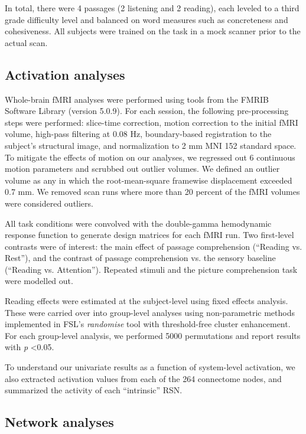 In total, there were 4 passages (2 listening and 2 reading), each leveled to a third grade difficulty level and balanced on word measures such as concreteness and cohesiveness.  All subjects were trained on the task in a mock scanner prior to the actual scan. 


\subsection{Activation analyses}

Whole-brain fMRI analyses were performed using tools from the FMRIB Software Library (version 5.0.9). For each session, the following pre-processing steps were performed:  slice-time correction, motion correction to the initial fMRI volume, high-pass filtering at 0.08 Hz, boundary-based registration to the subject's structural image, and normalization to 2 mm MNI 152 standard space. To mitigate the effects of motion on our analyses, we regressed out 6 continuous motion parameters and scrubbed out outlier volumes. We defined an outlier volume as any in which the root-mean-square framewise displacement exceeded 0.7 mm. We removed scan runs where more than 20 percent of the fMRI volumes were considered outliers.

All task conditions were convolved with the double-gamma hemodynamic response function to generate design matrices for each fMRI run. Two first-level contrasts were of interest: the main effect of passage comprehension (``Reading vs. Rest''), and the contrast of passage comprehension vs. the sensory baseline (``Reading vs. Attention''). Repeated stimuli and the picture comprehension task were modelled out.

Reading effects were estimated at the subject-level using fixed effects analysis. These were carried over into group-level analyses using non-parametric methods implemented in FSL’s \textit{randomise} tool with threshold-free cluster enhancement. For each group-level analysis, we performed 5000 permutations and report results with \textit{p} \textless 0.05. 

To understand our univariate results as a function of system-level activation, we also extracted activation values from each of the 264 connectome nodes, and summarized the activity of each ``intrinsic'' RSN.

\subsection{Network analyses}

